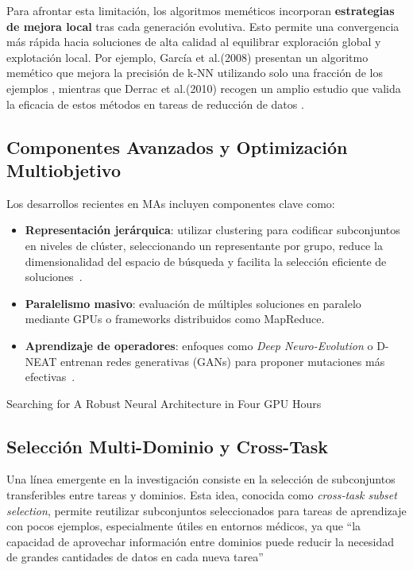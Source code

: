 Para afrontar esta limitación, los algoritmos meméticos incorporan \textbf{estrategias de mejora local} tras cada generación evolutiva.
Esto permite una convergencia más rápida hacia soluciones de alta calidad al equilibrar exploración global y explotación local.
Por ejemplo, García et al.(2008) presentan un algoritmo memético que mejora la precisión de k-NN utilizando solo una fracción de los ejemplos \cite{https://www.sciencedirect.com/science/article/abs/pii/S0031320308000770}, mientras que Derrac et al.(2010) recogen un amplio estudio que valida la eficacia de estos métodos en tareas de reducción de datos \cite{https://www.igi-global.com/chapter/content/63814}.

\subsection{Componentes Avanzados y Optimización Multiobjetivo}

Los desarrollos recientes en MAs incluyen componentes clave como:

\begin{itemize}
    \item \textbf{Representación jerárquica}: utilizar clustering para codificar subconjuntos en niveles de clúster, seleccionando un representante por grupo, reduce la dimensionalidad del espacio de búsqueda y facilita la selección eficiente de soluciones~\cite{https://arxiv.org/abs/2108.08453}.
    \item \textbf{Paralelismo masivo}: evaluación de múltiples soluciones en paralelo mediante GPUs o frameworks distribuidos como MapReduce.
    \item \textbf{Aprendizaje de operadores}: enfoques como \textit{Deep Neuro-Evolution} o D-NEAT entrenan redes generativas (GANs) para proponer mutaciones más efectivas~\cite{https://arxiv.org/abs/1802.01548}.
\end{itemize}
Searching for A Robust Neural Architecture in Four GPU Hours

\subsection{Selección Multi-Dominio y Cross-Task}

Una línea emergente en la investigación consiste en la selección de subconjuntos transferibles entre tareas y dominios.
Esta idea, conocida como \textit{cross‑task subset selection}, permite reutilizar subconjuntos seleccionados para tareas de aprendizaje con pocos ejemplos, 
especialmente útiles en entornos médicos, ya que “la capacidad de aprovechar información entre dominios puede reducir la necesidad de grandes cantidades de datos en cada nueva tarea”~\cite{https://www.nature.com/articles/s41597-025-04866-4}


